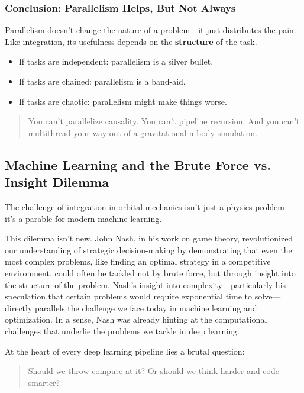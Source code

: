 \subsubsection{Conclusion: Parallelism Helps, But Not Always}

Parallelism doesn’t change the nature of a problem—it just distributes the pain. Like integration, its usefulness depends on the \textbf{structure} of the task.

\begin{itemize}
  \item If tasks are independent: parallelism is a silver bullet.
  \item If tasks are chained: parallelism is a band-aid.
  \item If tasks are chaotic: parallelism might make things worse.
\end{itemize}

\begin{quote}
You can’t parallelize causality. You can’t pipeline recursion.  
And you can’t multithread your way out of a gravitational n-body simulation.
\end{quote}



\subsection{Machine Learning and the Brute Force vs. Insight Dilemma}

The challenge of integration in orbital mechanics isn’t just a physics problem—it’s a parable for modern machine learning.

This dilemma isn’t new. John Nash, in his work on game theory, revolutionized our understanding of strategic decision-making by demonstrating that even the most complex problems, like finding an optimal strategy in a competitive environment, could often be tackled not by brute force, but through insight into the structure of the problem. Nash's insight into complexity—particularly his speculation that certain problems would require exponential time to solve—directly parallels the challenge we face today in machine learning and optimization. In a sense, Nash was already hinting at the computational challenges that underlie the problems we tackle in deep learning.

At the heart of every deep learning pipeline lies a brutal question:

\begin{quote} Should we throw compute at it? Or should we think harder and code smarter? \end{quote}

